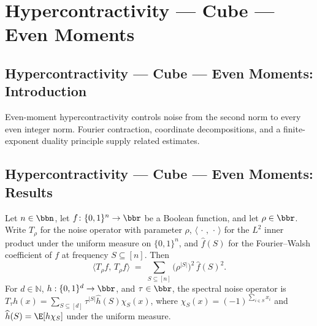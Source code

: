 \section{Hypercontractivity --- Cube --- Even Moments}
\subsection*{Hypercontractivity --- Cube --- Even Moments: Introduction}
Even-moment hypercontractivity controls noise from the second norm to every even integer norm. Fourier contraction, coordinate decompositions, and a finite-exponent duality principle supply related estimates.

\subsection*{Hypercontractivity --- Cube --- Even Moments: Results}

\begin{lemma}
\leanok
{}
\label{BooleanAnalysis.Hypercontractivity.noise_l2_fourier}
Let $n\in\bbn$, let $f\colon\{0,1\}^n\to\bbr$ be a Boolean function, and let
$\rho\in\bbr$. Write $T_\rho$ for the noise operator with parameter $\rho$,
$\langle\,\cdot\,,\,\cdot\,\rangle$ for the $L^2$ inner product under the uniform
measure on $\{0,1\}^n$, and $\hat f(S)$ for the Fourier--Walsh coefficient of $f$ at
frequency $S\subseteq[n]$. Then
\[
  \langle T_\rho f,\, T_\rho f\rangle
  \;=\; \sum_{S\subseteq[n]} \bigl(\rho^{|S|}\bigr)^2\,\hat f(S)^2 .
\] For $d\in\mathbb N$, $h:\{0,1\}^d\to\bbr$, and $\tau\in\bbr$, the spectral noise
operator is $T_\tau h(x)=\sum_{S\subseteq[d]}\tau^{|S|}\widehat h(S)\chi_S(x)$, where
$\chi_S(x)=(-1)^{\sum_{i\in S}x_i}$ and $\widehat h(S)=\E[h\chi_S]$ under the uniform
measure.
\end{lemma}

